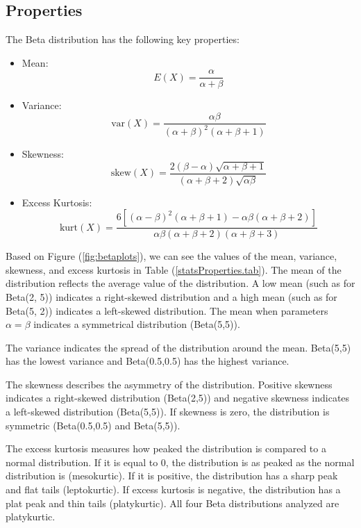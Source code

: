 \documentclass{article}\usepackage[]{graphicx}\usepackage[]{xcolor}
\begin{document}
\begin{multicols}{2}
\section{Properties}\label{sec:prop}

The Beta distribution has the following key properties:
\begin{itemize}
    \item Mean: 
    $$E(X) = \frac{\alpha}{\alpha + \beta}$$

    \item Variance:
    $$\text{var}(X) = \frac{\alpha \beta}{(\alpha + \beta)^2 (\alpha + \beta + 1)}$$

    \item Skewness:
    $$\text{skew}(X) = \frac{2(\beta - \alpha)\sqrt{\alpha + \beta + 1}}{(\alpha + \beta + 2)\sqrt{\alpha \beta}}$$

    \item Excess Kurtosis:
    $$\text{kurt}(X) = \frac{6[(\alpha - \beta)^2(\alpha + \beta + 1) - \alpha \beta(\alpha + \beta + 2)]}{\alpha \beta (\alpha + \beta + 2)(\alpha + \beta + 3)}$$
\end{itemize}

Based on Figure (\ref{fig:betaplots}), we can see the values of the mean, variance, skewness, and excess kurtosis in Table (\ref{statsProperties.tab}). The mean of the distribution reflects the average value of the distribution. A low mean (such as for Beta(2, 5)) indicates a right-skewed distribution and a high mean (such as for Beta(5, 2)) indicates a left-skewed distribution. The mean when parameters $\alpha = \beta$ indicates a symmetrical distribution (Beta(5,5)). 

The variance indicates the spread of the distribution around the mean. Beta(5,5) has the lowest variance and Beta(0.5,0.5) has the highest variance.

The skewness describes the asymmetry of the distribution. Positive skewness indicates a right-skewed distribution (Beta(2,5)) and negative skewness indicates a left-skewed distribution (Beta(5,5)). If skewness is zero, the distribution is symmetric (Beta(0.5,0.5) and Beta(5,5)).

The excess kurtosis measures how peaked the distribution is compared to a normal distribution. If it is equal to 0, the distribution is as peaked as the normal distribution is (mesokurtic). If it is positive, the distribution has a sharp peak and flat tails (leptokurtic). If excess kurtosis is negative, the distribution has a plat peak and thin tails (platykurtic). All four Beta distributions analyzed are platykurtic.


\end{multicols}
\end{document}
